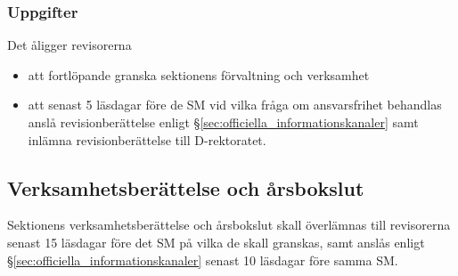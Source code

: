 \documentclass{dgovdoc}
\begin{document}
\subsubsection{Uppgifter}

Det åligger revisorerna

\begin{itemize}
  \item att fortlöpande granska sektionens förvaltning och verksamhet
  \item att senast 5 läsdagar före de SM vid vilka fråga om ansvarsfrihet
    behandlas anslå revisionberättelse enligt
    \S\ref{sec:officiella_informationskanaler} samt inlämna revisionberättelse
    till D-rektoratet.
\end{itemize}

\subsection{Verksamhetsberättelse och årsbokslut}

Sektionens verksamhetsberättelse och årsbokslut skall överlämnas till
revisorerna senast 15 läsdagar före det SM på vilka de skall granskas, samt
anslås enligt \S\ref{sec:officiella_informationskanaler} senast 10 läsdagar före
samma SM.
\end{document}
